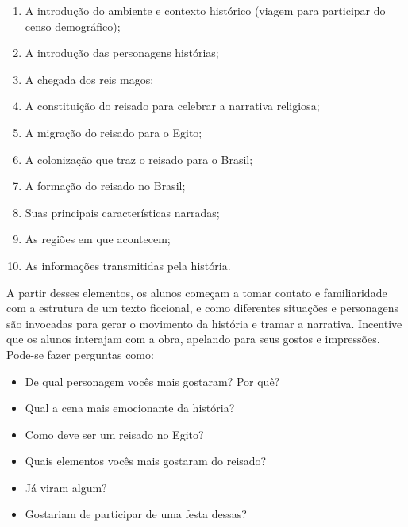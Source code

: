 \documentclass[11pt]{extarticle}
\begin{document}
\begin{enumerate}
\item A introdução do ambiente e contexto histórico (viagem para participar do censo demográfico);

\item A introdução das personagens histórias;

\item A chegada dos reis magos;

\item A constituição do reisado para celebrar a narrativa religiosa;

\item A migração do reisado para o Egito;

\item A colonização que traz o reisado para o Brasil;

\item A formação do reisado no Brasil;

\item Suas principais características narradas;

\item As regiões em que acontecem;

\item As informações transmitidas pela história.
\end{enumerate}

A partir desses elementos, os alunos começam a tomar contato e familiaridade com a estrutura de um texto ficcional, e como diferentes situações e personagens são invocadas para gerar o movimento da história e tramar a narrativa. Incentive que os alunos interajam com a obra, apelando para seus gostos e impressões.
Pode-se fazer perguntas como:

\begin{itemize}
\item De qual personagem vocês mais gostaram? Por quê?

\item Qual a cena mais emocionante da história?

\item Como deve ser um reisado no Egito?

\item Quais elementos vocês mais gostaram do reisado?

\item Já viram algum?

\item Gostariam de participar de uma festa dessas?
\end{itemize}
\end{document}
